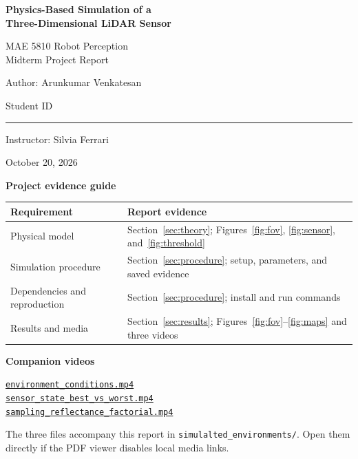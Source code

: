 \documentclass[11pt,letterpaper]{article}
\newcommand{\videolink}[2]{\href{run:simulalted_environments/#1}{\texttt{#2}}}
\begin{document}
\begin{titlepage}
\centering
\vspace*{0.6in}
{\LARGE\bfseries Physics-Based Simulation of a\\[5pt]Three-Dimensional LiDAR Sensor\par}
\vspace{0.3in}
{\large MAE 5810 Robot Perception\\Midterm Project Report\par}
\vspace{0.45in}
Author: Arunkumar Venkatesan\par
\vspace{0.15in}
Student ID \rule{2.6in}{0.4pt}\par
\vspace{0.3in}
Instructor: Silvia Ferrari\par
October 20, 2026\par
\vspace{0.45in}
\textbf{Project evidence guide}\par
\vspace{0.08in}
\begin{tabular}{@{}p{1.55in}p{4.4in}@{}}\toprule
Requirement & Report evidence\\\midrule
Physical model & Section~\ref{sec:theory}; Figures~\ref{fig:fov}, \ref{fig:sensor}, and~\ref{fig:threshold}\\
Simulation procedure & Section~\ref{sec:procedure}; setup, parameters, and saved evidence\\
Dependencies and reproduction & Section~\ref{sec:procedure}; install and run commands\\
Results and media & Section~\ref{sec:results}; Figures~\ref{fig:fov}--\ref{fig:maps} and three videos\\\bottomrule
\end{tabular}\par
\vspace{0.25in}
\textbf{Companion videos}\par
{\small{}
\videolink{environment_conditions.mp4}{environment\_conditions.mp4}\\
\videolink{sensor_state_best_vs_worst.mp4}{sensor\_state\_best\_vs\_worst.mp4}\\
\videolink{sampling_reflectance_factorial.mp4}{sampling\_reflectance\_factorial.mp4}\par}
\vspace{0.15in}
{\small The three files accompany this report in \texttt{simulalted\_environments/}. Open them directly if the PDF viewer disables local media links.\par}
\end{titlepage}
\setcounter{page}{2}
\end{document}
